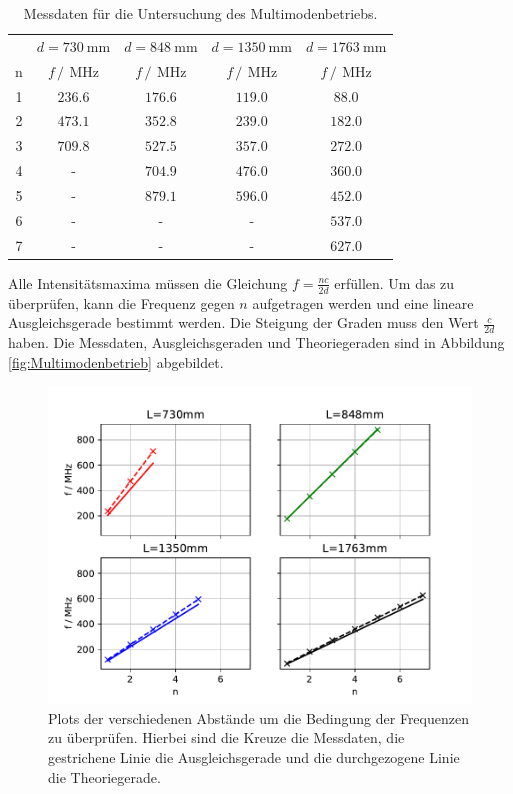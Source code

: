 \FloatBarrier
\begin{table}
  \centering
  \caption{Messdaten für die Untersuchung des Multimodenbetriebs.}
  \begin{tabular}{c c c c c}
    \toprule
    &$d=\SI{730}{\milli\meter}$&$d=\SI{848}{\milli\meter}$&$d=\SI{1350}{\milli\meter}$&$d=\SI{1763}{\milli\meter}$\\
    n&$f\,/\,\SI{}{\mega\hertz}$&$f\,/\,\SI{}{\mega\hertz}$&$f\,/\,\SI{}{\mega\hertz}$&$f\,/\,\SI{}{\mega\hertz}$\\
    \midrule
    1&$\num{236.6}$&$\num{176.6}$&$\num{119.0}$&$\num{88.0}$\\
    2&$\num{473.1}$&$\num{352.8}$&$\num{239.0}$&$\num{182.0}$\\
    3&$\num{709.8}$&$\num{527.5}$&$\num{357.0}$&$\num{272.0}$\\
    4&-&$\num{704.9}$&$\num{476.0}$&$\num{360.0}$\\
    5&-&$\num{879.1}$&$\num{596.0}$&$\num{452.0}$\\
    6&-&-&-&$\num{537.0}$\\
    7&-&-&-&$\num{627.0}$\\
  \end{tabular}
\end{table}
\FloatBarrier

Alle Intensitätsmaxima müssen die Gleichung $f = \frac{nc}{2d}$ erfüllen. Um das zu überprüfen, kann die 
Frequenz gegen $n$ aufgetragen werden und eine lineare Ausgleichsgerade bestimmt werden. Die Steigung der 
Graden muss den Wert $\frac{c}{2d}$ haben.
Die Messdaten, Ausgleichsgeraden und Theoriegeraden sind in Abbildung \ref{fig:Multimodenbetrieb} abgebildet.

\FloatBarrier
\begin{figure}
  \centering
  \includegraphics[width = \textwidth, keepaspectratio]{figure/Multimode.pdf}
  \caption{Plots der verschiedenen Abstände um die Bedingung der Frequenzen zu überprüfen. Hierbei sind die Kreuze die Messdaten, die gestrichene Linie die Ausgleichsgerade und die durchgezogene Linie die Theoriegerade.}
\end{figure}
\FloatBarrier

